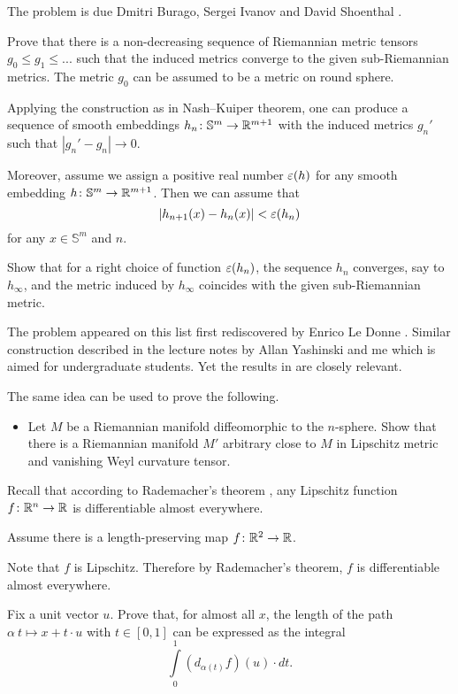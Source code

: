The problem is due
Dmitri Burago, 
Sergei Ivanov 
and David Shoenthal \cite[see][]{BIS}.

Prove that there is a non-decreasing sequence of Riemannian metric tensors
$g_0\le g_1\le ...$ such that the induced metrics converge to the given sub-Riemannian metrics.
The metric $g_0$ can be assumed to be a metric on round sphere.

Applying the construction as in Nash--Kuiper theorem,
one can produce a sequence of smooth embeddings $h_n\colon\mathbb{S}^m\to \mathbb{R}^{m+1}$ with the induced metrics $g_n'$
such that $|g_n'-g_n|\to 0$.

Moreover, assume we assign a positive real number $\varepsilon(h)$ for any smooth embedding $h\colon\mathbb{S}^m\to\mathbb{R}^{m+1}$.
Then we can assume that 
\[|h_{n+1}(x)-h_n(x)|<\varepsilon(h_n)\] for any $x\in \mathbb{S}^m$ and $n$.

Show that for a right choice of function $\varepsilon(h_n)$,
the sequence $h_n$ converges, say to $h_\infty$, 
and the metric induced by $h_\infty$ coincides with the given sub-Riemannian metric.\qeds


The problem appeared 
on this list first rediscovered by Enrico Le Donne \cite[see][]{le-donne}.
Similar construction described in the lecture notes by Allan Yashinski and me \cite[see][]{petrunin-yashinsky} 
which is aimed for undergraduate students. 
Yet the results in \cite{petrunin-paths} are closely relevant.

The same idea can be used to prove the following.
\begin{itemize}
\item Let $M$ be a Riemannian manifold diffeomorphic to the $n$-sphere. 
Show that there is a Riemannian manifold $M'$ arbitrary close to $M$ in Lipschitz metric and vanishing Weyl curvature tensor.
\end{itemize}


Recall that according to Rademacher's theorem \cite{rademacher},
any Lipschitz function $f\colon\mathbb{R}^n\to\mathbb{R}$ 
is differentiable almost everywhere.


Assume there is a length-preserving map $f\colon\mathbb{R}^2\to \mathbb{R}$.

Note that $f$ is Lipschitz.
Therefore by Rademacher's theorem, $f$ is differentiable almost everywhere.

Fix a unit vector $u$.
Prove that, for almost all $x$, the length of the path 
$\alpha\:t\mapsto x+t\cdot u$ with $t\in[0,1]$ can be expressed as the integral
\[\int\limits_0^1 (d_{\alpha(t)}f)(u) \cdot dt.\]

